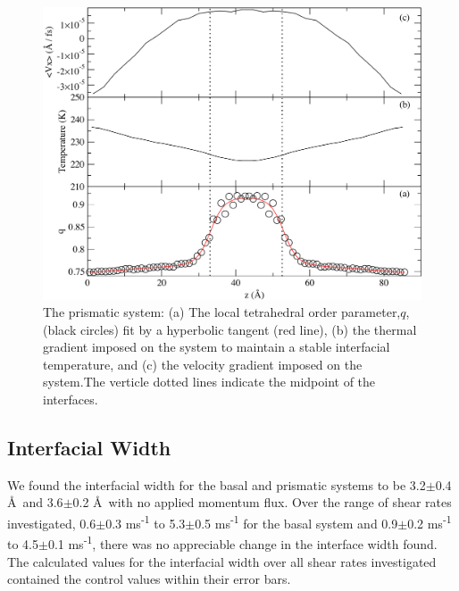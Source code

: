 \documentclass[journal = jpccck, manuscript = article]{achemso}
\begin{document}

\begin{figure}
\includegraphics[width=\linewidth]{pComicStrip}
\caption{\label{fig:pComic} The prismatic system: (a) The local tetrahedral order parameter,$q$, (black circles) fit by a hyperbolic tangent (red line), (b) the thermal gradient imposed on the system to maintain a stable interfacial temperature, and (c) the velocity gradient imposed on the system.The verticle dotted lines indicate the midpoint of the interfaces.}
\end{figure}


\subsection{Interfacial Width}
We found the interfacial width for the basal and prismatic systems to be 3.2$\pm$0.4 \AA\ and 3.6$\pm$0.2 \AA\ with no applied momentum flux. Over the range of shear rates investigated, 0.6$\pm$0.3 ms\textsuperscript{-1} to 5.3$\pm$0.5 ms\textsuperscript{-1} for the basal system and 0.9$\pm$0.2 ms\textsuperscript{-1} to 4.5$\pm$0.1 ms\textsuperscript{-1}, there was no appreciable change in the interface width found. The calculated values for the interfacial width over all shear rates investigated contained the control values within their error bars.
\end{document}

